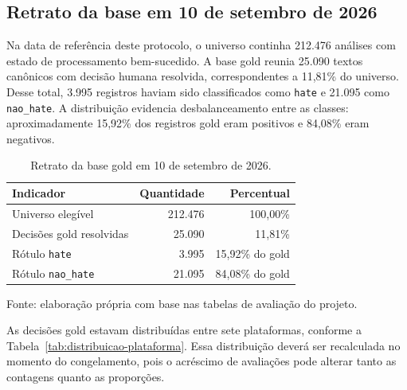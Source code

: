 \subsection{Retrato da base em 10 de setembro de 2026}

Na data de referência deste protocolo, o universo continha 212.476 análises com
estado de processamento bem-sucedido. A base gold reunia 25.090 textos canônicos
com decisão humana resolvida, correspondentes a 11,81\% do universo. Desse total,
3.995 registros haviam sido classificados como \texttt{hate} e 21.095 como
\texttt{nao\_hate}. A distribuição evidencia desbalanceamento entre as classes:
aproximadamente 15,92\% dos registros gold eram positivos e 84,08\% eram
negativos.

\begin{table}[htbp]
    \centering
    \caption{Retrato da base gold em 10 de setembro de 2026.}
    \label{tab:retrato-base-gold}
    \begin{tabular}{lrr}
        \toprule
        \textbf{Indicador} & \textbf{Quantidade} & \textbf{Percentual} \\
        \midrule
        Universo elegível & 212.476 & 100,00\% \\
        Decisões gold resolvidas & 25.090 & 11,81\% \\
        Rótulo \texttt{hate} & 3.995 & 15,92\% do gold \\
        Rótulo \texttt{nao\_hate} & 21.095 & 84,08\% do gold \\
        \bottomrule
    \end{tabular}
    \par\smallskip
    {\footnotesize Fonte: elaboração própria com base nas tabelas de avaliação
    do projeto.\par}
\end{table}

As decisões gold estavam distribuídas entre sete plataformas, conforme a
Tabela~\ref{tab:distribuicao-plataforma}. Essa distribuição deverá ser recalculada
no momento do congelamento, pois o acréscimo de avaliações pode alterar tanto as
contagens quanto as proporções.

